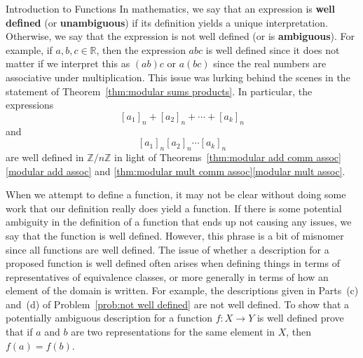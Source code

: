 \begin{section}{Introduction to Functions}
In mathematics, we say that an expression is \textbf{well defined} (or \textbf{unambiguous}) if its definition yields a unique interpretation.  Otherwise, we say that the expression is not well defined (or is \textbf{ambiguous}).  For example, if $a,b,c\in\mathbb{R}$, then the expression $abc$ is well defined since it does not matter if we interpret this as $(ab)c$ or $a(bc)$ since the real numbers are associative under multiplication.  This issue was lurking behind the scenes in the statement of Theorem~\ref{thm:modular sums products}.  In particular, the expressions
\[
[a_1]_n+[a_2]_n+\cdots+ [a_k]_n
\]
and
\[
[a_1]_n [a_2]_n \cdots  [a_k]_n
\]
are well defined in $\mathbb{Z}/n\mathbb{Z}$ in light of Theorems~\ref{thm:modular add comm assoc}\ref{modular add assoc} and \ref{thm:modular mult comm assoc}\ref{modular mult assoc}.

When we attempt to define a function, it may not be clear without doing some work that our definition really does yield a function. If there is some potential ambiguity in the definition of a function that ends up not causing any issues, we say that the function is well defined. However, this phrase is a bit of misnomer since all functions are well defined. The issue of whether a description for a proposed function is well defined often arises when defining things in terms of representatives of equivalence classes, or more generally in terms of how an element of the domain is written.  For example, the descriptions given in Parts~(c) and~(d) of Problem~\ref{prob:not well defined} are not well defined.  To show that a potentially ambiguous description for a function $f:X\to Y$ is well defined prove that if $a$ and $b$ are two representations for the same element in $X$, then $f(a)=f(b)$.


\end{section}
